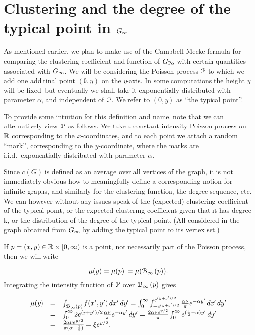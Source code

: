 


\section{Clustering and the degree of the typical point in $G_{\infty}$\label{sec:Ginf}\label{sec:asymptotics_average_clustering_ast_P}}


As mentioned earlier, we plan to make use of the Campbell-Mecke formula for comparing the clustering coefficient and function of $G_{\text{Po}}$ with certain quantities associated with $G_{\infty}$. We will be considering the Poisson process ${\mathcal P}$ to which we add one additinal point $(0,y)$ on the $y$-axis. In some computations the height $y$ will be fixed, but eventually we shall take it exponentially distributed with parameter $\alpha$, and independent of ${\mathcal P}$.
We refer to $(0,y)$ as ``the typical point''.

To provide some intu\"{\i}tion for this definition and name, note that we can alternatively view ${\mathcal P}$ as follows. 
We take a constant intensity Poisson process on ${\mathbb R}$ corresponding to the $x$-coordinates, and to each point
we attach a random ``mark'', corresponding to the $y$-coordinate, where the marks are i.i.d.~exponentially distributed with parameter $\alpha$.


Since $c(G)$ is defined as an average over all vertices of the graph, it is not immediately obvious how to meaningfully define a corresponding notion for infinite graphs, and similarly for the clustering function, the degree sequence, etc.
We can however without any issues speak of the (expected) clustering coefficient of the typical point, or the expected clustering coefficient given that it has degree k, or the distribution of the degree of the typical point. (All considered in the graph obtained from $G_{\infty}$ by adding the typical point to its vertex set.)

If $p = (x,y) \in {\mathbb R}\times[0,\infty)$ is a point, not necessarily part of the Poisson process, then we will write

$$ \mu(y) = \mu(p) := \mu({\mathcal B}_{\infty}\left(p\right)). $$
Integrating the intensity function of ${\mathcal P}$ over ${\mathcal B}_{\infty}\left(p\right)$ gives

$$ \begin{array}{rcl} 
\mu(y) & = & \int_{{\mathcal B}_{\infty}\left(p\right)} f(x',y') \, dx' \,d y'  
 = \int_0^\infty \int_{-e^{(y+y')/2}}^{e^{(y+y')/2}} \frac{\alpha \nu}{\pi} e^{-\alpha y'} \, dx' \, dy' \\
& = & \int_0^\infty 2 e^{(y+y')/2} \frac{\alpha \nu}{\pi} e^{-\alpha y'} \, dy' 
 = \frac{2\alpha \nu e^{y/2}}{\pi} \int_0^\infty e^{(\frac12-\alpha)y'} \, dy' \\
& = & \frac{2\alpha \nu e^{y/2}}{\pi(\alpha-\frac12)} = \xi e^{y/2}.
\end{array} $$





